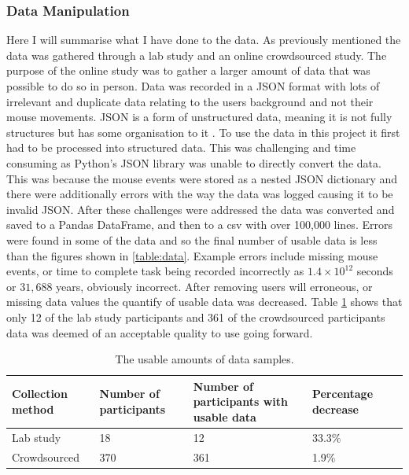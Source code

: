 \documentclass{article}
\begin{document}

\subsubsection{Data Manipulation}

Here I will summarise what I have done to the data.
As previously mentioned the data was gathered through a lab study and an online crowdsourced study.
The purpose of the online study was to gather a larger amount of data that was possible to do so in person.
Data was recorded in a JSON format with lots of irrelevant and duplicate data relating to the users background and not their mouse movements.
JSON is a form of unstructured data, meaning it is not fully structures but has some organisation to it \cite{ronk2014structured}.
To use the data in this project it first had to be processed into structured data.
This was challenging and time consuming as Python's JSON library was unable to directly convert the data.
This was because the mouse events were stored as a nested JSON dictionary and there were additionally errors with the way the data was logged causing it to be invalid JSON.
After these challenges were addressed the data was converted and saved to a Pandas DataFrame, and then to a csv with over 100,000 lines.
Errors were found in some of the data and so the final number of usable data is less than the figures shown in \ref{table:data}.
Example errors include missing mouse events, or time to complete task being recorded incorrectly as 
$1.4 \times 10^{12}$ seconds or $31,688$ years, obviously incorrect.
After removing users will erroneous, or missing data values the quantify of usable data was decreased.
Table \ref{table:UseableData} shows that only 12 of the lab study participants and 361 of the crowdsourced participants data was deemed of an acceptable quality to use going forward.

\begin{table}[ht]
    \caption{\label{table:UseableData} The usable amounts of data samples.}
    \small
    \begin{tabular}{llp{2.3cm}ll}
        \hline
        Collection method   & Number of participants & Number of participants with usable data  & Percentage decrease \\  \hline
        Lab study           & 18                        & 12                                    & 33.3\%  \\
        Crowdsourced        & 370                       & 361                                   & 1.9\%  \\  \hline
    \end{tabular}
\end{table}
\end{document}
